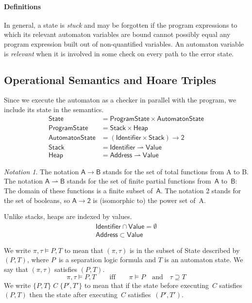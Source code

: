 \documentclass[a4paper]{article}
\newcommand{\pmap}{\rightharpoonup}
\theoremstyle{remark}
\newtheorem*{notation}{Notation}
\begin{document}
\paragraph{Definitions}
In general, a state is \emph{stuck} and may be forgotten if the program expressions to which its relevant automaton variables are bound cannot possibly equal any program expression built out of non-quantified variables.
An automaton variable is \emph{relevant} when it is involved in some check on every path to the error state.

\subsection{Operational Semantics and Hoare Triples}\label{sec:opsem} %

Since we execute the automaton as a checker in parallel with the program, we include its state in the semantics.
\begin{align}
\mathsf{State}&=\mathsf{ProgramState}\times\mathsf{AutomatonState} \\
\mathsf{ProgramState}&=\mathsf{Stack}\times\mathsf{Heap} \\
\mathsf{AutomatonState}&=
  (\mathsf{Identifier}\times\mathsf{Stack})\to\mathsf{2} \\
\mathsf{Stack}&=\mathsf{Identifier}\pmap\mathsf{Value} \\
\mathsf{Heap}&=\mathsf{Address}\pmap\mathsf{Value}
\end{align}

\begin{notation}
The notation $\mathsf A\to\mathsf B$ stands for the set of total functions from \textsf A to \textsf B.
The notation $\mathsf A\pmap\mathsf B$ stands for the set of finite partial functions from~$\mathsf A$ to~$\mathsf B$: 
The domain of these functions is a finite subset of~$\mathsf A$.
The notation \textsf 2 stands for the set of booleans, so $\mathsf A\to\mathsf 2$ is (isomorphic to) the power set of~\textsf A.
\end{notation}

Unlike stacks, heaps are indexed by values.
\begin{gather}
\mathsf{Identifier}\cap\mathsf{Value}=\emptyset \\
\mathsf{Address}\subset\mathsf{Value}
\end{gather}

We write $\pi,\tau\vDash P,T$ to mean that $(\pi,\tau)$ is in the subset of \textsf{State} described by~$(P,T)$, where $P$~is a separation logic formula and $T$ is an automaton state.
We say that $(\pi,\tau)$ satisfies $(P,T)$.
\begin{equation}
\pi, \tau \vDash P, T 
  \qquad\text{iff}\qquad
\pi \vDash P
  \quad\text{and}\quad
\tau\supseteq T
\end{equation}
We write $\{P,T\}\;C\;\{P',T'\}$ to mean that if the state before executing~$C$ satisfies $(P,T)$ then the state after executing~$C$ satisfies~$(P',T')$.
\end{document}
